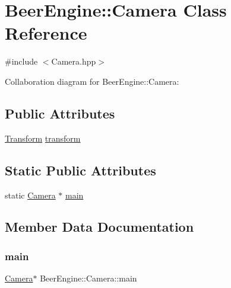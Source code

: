 \hypertarget{class_beer_engine_1_1_camera}{}\section{Beer\+Engine\+:\+:Camera Class Reference}
\label{class_beer_engine_1_1_camera}


{\ttfamily \#include $<$Camera.\+hpp$>$}



Collaboration diagram for Beer\+Engine\+:\+:Camera\+:
\subsection*{Public Attributes}
\begin{DoxyCompactItemize}
\item 
\mbox{\hyperlink{class_beer_engine_1_1_transform}{Transform}} \mbox{\hyperlink{class_beer_engine_1_1_camera_a4bbec6c322e5f260eca34a98d2eaeb93}{transform}}
\end{DoxyCompactItemize}
\subsection*{Static Public Attributes}
\begin{DoxyCompactItemize}
\item 
static \mbox{\hyperlink{class_beer_engine_1_1_camera}{Camera}} $\ast$ \mbox{\hyperlink{class_beer_engine_1_1_camera_aca558a665afcf487dc66e7deb5edba58}{main}}
\end{DoxyCompactItemize}


\subsection{Member Data Documentation}
\mbox{\label{class_beer_engine_1_1_camera_aca558a665afcf487dc66e7deb5edba58}} 
\subsubsection{\texorpdfstring{main}{main}}
{\footnotesize\ttfamily \mbox{\hyperlink{class_beer_engine_1_1_camera}{Camera}}$\ast$ Beer\+Engine\+::\+Camera\+::main\hspace{0.3cm}{\ttfamily [static]}}

